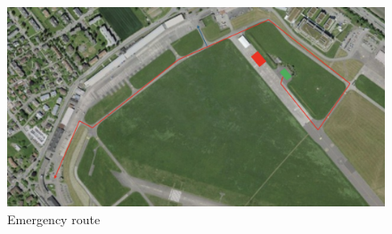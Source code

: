 \documentclass{article}
\begin{document}
\newpage

\begin{figure}[h]
    \centering
    \includegraphics[width=\textwidth]{assets/emergency_route.png}
    \caption{Emergency route}
    \label{fig:emergency-route}
\end{figure}

\newpage
\end{document}
